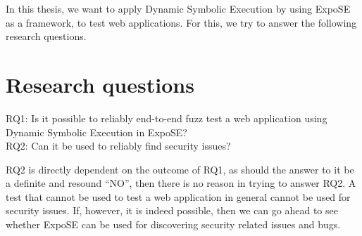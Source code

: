 In this thesis, we want to apply Dynamic Symbolic Execution by using ExpoSE as a framework, to test web applications. For this, we try to answer the following research questions.


\section{Research questions}
\label{sec:research-questions}


RQ1: Is it possible to reliably end-to-end fuzz test a web application using Dynamic Symbolic Execution in ExpoSE?\\
RQ2: Can it be used to reliably find security issues?

RQ2 is directly dependent on the outcome of RQ1, as should the answer to it be a definite and resound “NO”, then there is no reason in trying to answer RQ2. A test that cannot be used to test a web application in general cannot be used for security issues. If, however, it is indeed possible, then we can go ahead to see whether ExpoSE can be used for discovering security related issues and bugs.
